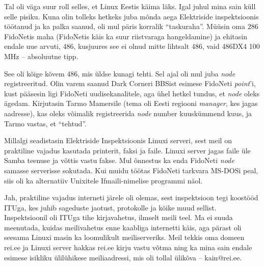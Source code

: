 
Tal oli väga suur roll selles, et Linux 
Eestis käima läks. Igal juhul mina sain küll selle pisiku. Kuna olin tolleks 
hetkeks juba mõnda aega Elektriside inspektsioonis töötanud ja ka palka saanud, oli mul päris korralik 
\enquote{taskuraha}. Müüsin oma 286 FidoNetis maha 
(FidoNetis käis ka suur riistvaraga hangeldamine) ja ehitasin endale uue arvuti,
486, kusjuures see ei olnud mitte lihtsalt 486, vaid 486DX4 
100 MHz -- absoluutne tipp. 

See oli kõige kõvem 486, mis üldse kunagi tehti. Sel ajal oli mul juba \emph{node} registreeritud. Olin varem saanud Dark Corneri 
BBSist esimese FidoNeti \emph{point}'i, kust 
pääsesin ligi FidoNeti uudisekanalitele, aga ühel hetkel tundus, et 
\emph{node} oleks ägedam. Kirjutasin Tarmo Mamersile (tema oli Eesti regiooni \emph{manager}, kes jagas aadresse), 
kas oleks võimalik registreerida \emph{node} number kuuskümmend kuus, ja 
Tarmo vastas, et \enquote{tehtud}.

Millalgi seadistasin Elektriside Inspektsioonis 
Linuxi serveri, sest meil on praktiline vajadus kasutada
printerit, faksi ja faile. Linuxi server jagas 
faile üle Samba teenuse ja võttis vastu fakse. Mul õnnestus ka enda 
FidoNeti \emph{node} samasse serverisse sokutada. Kui muidu töötas FidoNeti 
tarkvara MS-DOSi peal, siis oli ka alternatiiv Unixitele 
Ifmaili-nimelise programmi näol.


Jah, praktiline vajadus interneti järele oli olemas, sest 
inspektsioon tegi koostööd 
ITUga, kes 
juhib sageduste jaotust, protokolle ja kõike muud sellist. 
Inspektsioonil oli ITUga tihe kirjavahetus, ilmselt meili teel. Ma 
ei suuda meenutada, kuidas meilivahetus enne kaabliga internetti käis, aga 
pärast oli seesama Linuxi masin ka loomulikult meiliserveriks. Meil
tekkis oma domeen rei.ee ja Linuxi server hakkas rei.ee kirju vastu 
võtma ning ka mina sain endale esimese isikliku ülilühikese meiliaadressi, mis 
oli tollal ülikõva -- kain@rei.ee.

